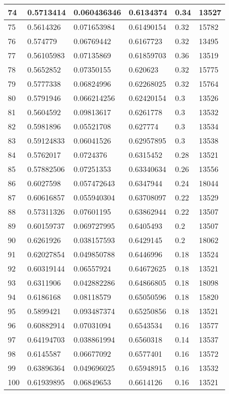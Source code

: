 \begin{longtable}{|l|l|l|l|l|l|}
74 & 0.5713414 & 0.060436346 & 0.6134374 & 0.34 & 13527 \\ \hline 
75 & 0.5614326 & 0.071653984 & 0.61490154 & 0.32 & 15782 \\ \hline 
76 & 0.574779 & 0.06769442 & 0.6167723 & 0.32 & 13495 \\ \hline 
77 & 0.56105983 & 0.07135869 & 0.61859703 & 0.36 & 13519 \\ \hline 
78 & 0.5652852 & 0.07350155 & 0.620623 & 0.32 & 15775 \\ \hline 
79 & 0.5777338 & 0.06824996 & 0.62268025 & 0.32 & 15764 \\ \hline 
80 & 0.5791946 & 0.066214256 & 0.62420154 & 0.3 & 13526 \\ \hline 
81 & 0.5604592 & 0.09813617 & 0.6261778 & 0.3 & 13532 \\ \hline 
82 & 0.5981896 & 0.05521708 & 0.627774 & 0.3 & 13534 \\ \hline 
83 & 0.59124833 & 0.06041526 & 0.62957895 & 0.3 & 13538 \\ \hline 
84 & 0.5762017 & 0.0724376 & 0.6315452 & 0.28 & 13521 \\ \hline 
85 & 0.57882506 & 0.07251353 & 0.63340634 & 0.26 & 13556 \\ \hline 
86 & 0.6027598 & 0.057472643 & 0.6347944 & 0.24 & 18044 \\ \hline 
87 & 0.60616857 & 0.055940304 & 0.63708097 & 0.22 & 13529 \\ \hline 
88 & 0.57311326 & 0.07601195 & 0.63862944 & 0.22 & 13507 \\ \hline 
89 & 0.60159737 & 0.069727995 & 0.6405493 & 0.2 & 13507 \\ \hline 
90 & 0.6261926 & 0.038157593 & 0.6429145 & 0.2 & 18062 \\ \hline 
91 & 0.62027854 & 0.049850788 & 0.6446996 & 0.18 & 13524 \\ \hline 
92 & 0.60319144 & 0.06557924 & 0.64672625 & 0.18 & 13521 \\ \hline 
93 & 0.6311906 & 0.042882286 & 0.64866805 & 0.18 & 18098 \\ \hline 
94 & 0.6186168 & 0.08118579 & 0.65050596 & 0.18 & 15820 \\ \hline 
95 & 0.5899421 & 0.093487374 & 0.65250856 & 0.18 & 13521 \\ \hline 
96 & 0.60882914 & 0.07031094 & 0.6543534 & 0.16 & 13577 \\ \hline 
97 & 0.64194703 & 0.038861994 & 0.6560318 & 0.14 & 13537 \\ \hline 
98 & 0.6145587 & 0.06677092 & 0.6577401 & 0.16 & 13572 \\ \hline 
99 & 0.63896364 & 0.049696025 & 0.65948915 & 0.16 & 13532 \\ \hline 
100 & 0.61939895 & 0.06849653 & 0.6614126 & 0.16 & 13521 \\ \hline 
\end{longtable}
